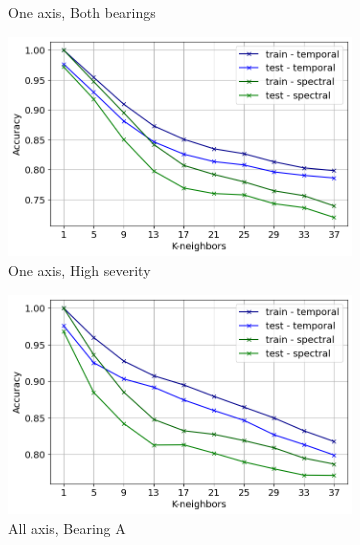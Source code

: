 \documentclass{llncs}
\begin{document}
\begin{figure}
\begin{subfigure}[b]{0.32\textwidth}
         \caption{One axis, Both bearings}
     \end{subfigure}
     \hfill
     \begin{subfigure}[b]{0.32\textwidth}
         \centering
         \includegraphics[width=\textwidth]{fig/all-features-mafaulda/one-axis-severity.png}
         \caption{One axis, High severity}
     \end{subfigure}
     \hfill
     \begin{subfigure}[b]{0.32\textwidth}
         \centering
         \includegraphics[width=\textwidth]{fig/all-features-mafaulda/all-axis-a-bearing.png}
         \caption{All axis, Bearing A}
     \end{subfigure}
     \hfill
     \begin{subfigure}[b]{0.32\textwidth}
         \centering

\end{subfigure}
\end{figure}
\end{document}
